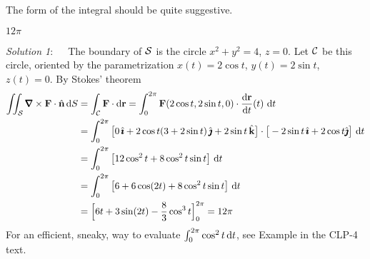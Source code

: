 \begin{hint} 
The form of the integral should be quite suggestive.
\end{hint}

\begin{answer} 
$12\pi$
\end{answer}


\begin{solution}  \emph{Solution 1}:\ \ \ 
The boundary of $\mathcal{S}$ is the circle $x^2+y^2=4$, $z=0$.
Let $\mathcal{C}$ be this circle, oriented by the parametrization $x(t)=2\cos t$, 
$y(t)=2\sin t$, $z(t)=0$. By Stokes' theorem
\begin{align*}
\dblInt_{\cS}\vnabla\times\vF\cdot\hn\,\dee{S}
&=\int_{\cC}\vF\cdot \dee{\vr}
=\int_0^{2\pi}\vF(2\cos t,2\sin t,0)\cdot \diff{\vr}{t}(t)\ \dee{t}\\
&=\int_0^{2\pi}\big[0\,\hi+2\cos t(3+2\sin t)\,\hj+2\sin t\,\hk\big]\cdot 
\big[-2\sin t\,\hi+2\cos t\hj\big]\ \dee{t}\\
&=\int_0^{2\pi}\big[12\cos^2 t+8\cos^2t\sin t\big]\ \dee{t} \\
&=\int_0^{2\pi}\big[6+6\cos(2t)+8\cos^2t\sin t\big]\ \dee{t} \\
&=\Big[6t+3\sin(2t) -\frac{8}{3}\cos^3 t\Big]_0^{2\pi}
=12\pi
\end{align*}
For an efficient, sneaky, way to evaluate 
$\int_0^{2\pi} \cos^2 t\,\mathrm{d}t$, see Example
 in the CLP-4 text.



\end{solution}
